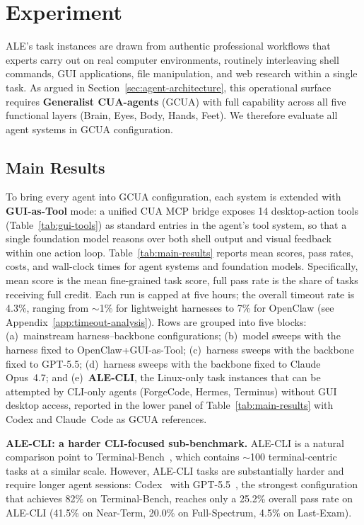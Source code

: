 

\section{Experiment}
\label{sec:experiment}

ALE's task instances are drawn from authentic professional workflows that experts carry out on real computer environments, routinely interleaving shell commands, GUI applications, file manipulation, and web research within a single task.
As argued in Section~\ref{sec:agent-architecture}, this operational surface requires \textbf{Generalist CUA-agents} (GCUA) with full capability across all five functional layers (Brain, Eyes, Body, Hands, Feet). We therefore evaluate all agent systems in GCUA configuration.

\subsection{Main Results}
To bring every agent into GCUA configuration, each system is extended with \textbf{GUI-as-Tool} mode: a unified CUA MCP bridge exposes 14 desktop-action tools (Table~\ref{tab:gui-tools}) as standard entries in the agent's tool system, so that a single foundation model reasons over both shell output and visual feedback within one action loop.
Table~\ref{tab:main-results} reports mean scores, pass rates, costs, and wall-clock times for agent systems and foundation models. Specifically, mean score is the mean fine-grained task score, full pass rate is the share of tasks receiving full credit. Each run is capped at five hours; the overall timeout rate is 4.3\%, ranging from ${\sim}$1\% for lightweight harnesses to 7\% for OpenClaw (see Appendix~\ref{app:timeout-analysis}).
Rows are grouped into five blocks: (a)~mainstream harness--backbone configurations; (b)~model sweeps with the harness fixed to OpenClaw+GUI-as-Tool; (c)~harness sweeps with the backbone fixed to GPT-5.5; (d)~harness sweeps with the backbone fixed to Claude Opus~4.7; and (e)~\textbf{ALE-CLI}, the \aleclicount{} Linux-only task instances that can be attempted by CLI-only agents (ForgeCode, Hermes, Terminus) without GUI desktop access, reported in the lower panel of Table~\ref{tab:main-results} with Codex and Claude~Code as GCUA references.

\noindent \textbf{ALE-CLI: a harder CLI-focused sub-benchmark.}
ALE-CLI is a natural comparison point to Terminal-Bench~\citep{merrill2026terminalbench}, which contains ${\sim}$100 terminal-centric tasks at a similar scale.
However, ALE-CLI tasks are substantially harder and require longer agent sessions:
Codex~\citep{openai2025codex} with GPT-5.5~\citep{openai2026gpt55}, the strongest configuration that achieves 82\% on Terminal-Bench, reaches only a 25.2\% overall pass rate on ALE-CLI (41.5\% on Near-Term, 20.0\% on Full-Spectrum, 4.5\% on \textcolor{lastexamred}{Last-Exam}).

